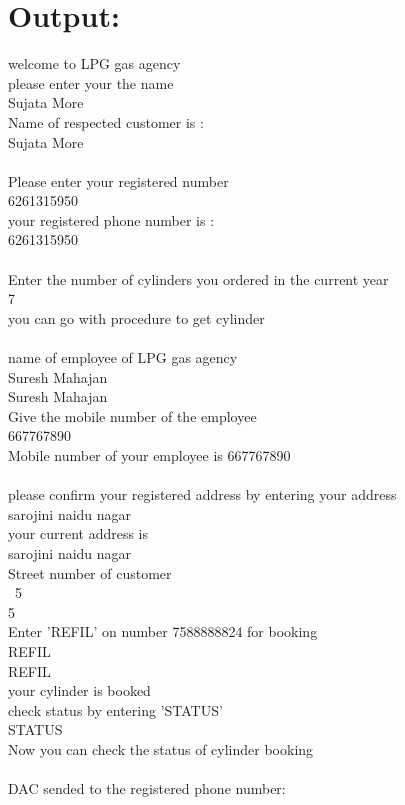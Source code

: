 \documentclass{article}
\begin{document}
{\section{Output:}		
welcome to LPG gas agency\\
please enter your the name\\
Sujata More\\
Name of respected customer is :\\
Sujata More\\
\\
Please enter your registered number\\
6261315950\\
your registered phone number is :\\
6261315950\\
\\
Enter the number of cylinders you ordered in the current year\\
7\\
you can go with procedure to get cylinder\\
\\
name of employee of LPG gas agency\\
Suresh Mahajan\\
Suresh Mahajan\\
Give the mobile number of the employee\\
667767890\\
Mobile number of your employee is 667767890\\
\\
please confirm your registered address by entering your address\\
sarojini naidu nagar\\
your current address is\\
sarojini naidu nagar\\
Street number of customer\\\
5\\
5\\
Enter 'REFIL' on number 7588888824  for booking\\
REFIL\\
REFIL\\
your cylinder is booked\\
check status by entering 'STATUS'\\
STATUS\\
Now you can check the status of cylinder booking\\
\\
DAC sended to the registered phone number:\\
}
\end{document}
